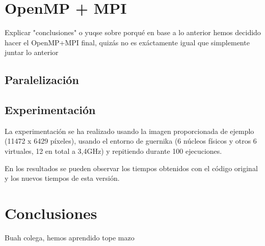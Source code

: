 \documentclass[12pt]{report} %
\begin{document}
\chapter{OpenMP + MPI}
\label{chap:OpenMP+MPI}
Explicar "conclusiones" o yuqse sobre porqué en base a lo anterior hemos decidido hacer el OpenMP+MPI final, quizás no es exáctamente igual que simplemente juntar lo anterior

\section{Paralelización}

\section{Experimentación}

La experimentación se ha realizado usando la imagen proporcionada de ejemplo (11472 x 6429 píxeles), usando el entorno de guernika (6 núcleos físicos y otros 6 virtuales, 12 en total a 3,4GHz) y repitiendo durante 100 ejecuciones.

En los resultados se pueden observar los tiempos obtenidos con el código original y los nuevos tiempos de esta versión.

\chapter{Conclusiones}

Buah colega, hemos aprendido tope mazo
\end{document}
